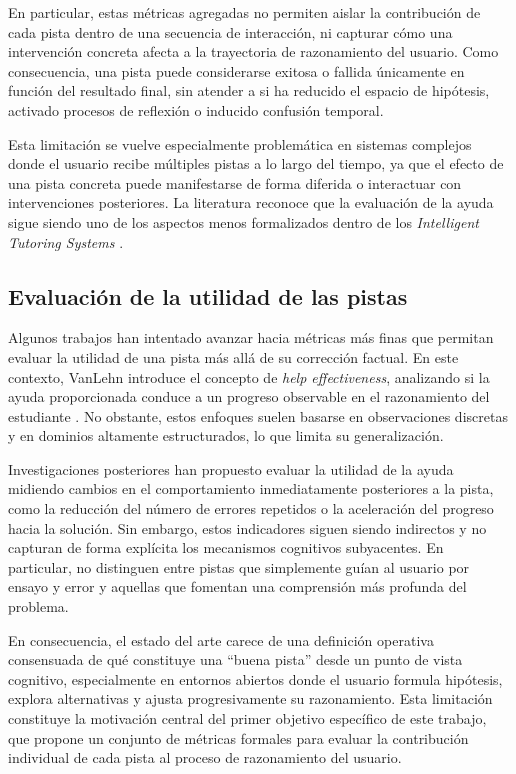 \documentclass[../main.tex]{subfiles}
\begin{document}
En particular, estas métricas agregadas no permiten aislar la contribución de cada pista dentro de una secuencia de interacción, ni capturar cómo una intervención concreta afecta a la trayectoria de razonamiento del usuario. Como consecuencia, una pista puede considerarse exitosa o fallida únicamente en función del resultado final, sin atender a si ha reducido el espacio de hipótesis, activado procesos de reflexión o inducido confusión temporal.

Esta limitación se vuelve especialmente problemática en sistemas complejos donde el usuario recibe múltiples pistas a lo largo del tiempo, ya que el efecto de una pista concreta puede manifestarse de forma diferida o interactuar con intervenciones posteriores. La literatura reconoce que la evaluación de la ayuda sigue siendo uno de los aspectos menos formalizados dentro de los \textit{Intelligent Tutoring Systems} \cite{VanLehn2006}.

\subsection{Evaluación de la utilidad de las pistas}

Algunos trabajos han intentado avanzar hacia métricas más finas que permitan evaluar la utilidad de una pista más allá de su corrección factual. En este contexto, VanLehn introduce el concepto de \textit{help effectiveness}, analizando si la ayuda proporcionada conduce a un progreso observable en el razonamiento del estudiante \cite{VanLehn2006}. No obstante, estos enfoques suelen basarse en observaciones discretas y en dominios altamente estructurados, lo que limita su generalización.

Investigaciones posteriores han propuesto evaluar la utilidad de la ayuda midiendo cambios en el comportamiento inmediatamente posteriores a la pista, como la reducción del número de errores repetidos o la aceleración del progreso hacia la solución. Sin embargo, estos indicadores siguen siendo indirectos y no capturan de forma explícita los mecanismos cognitivos subyacentes. En particular, no distinguen entre pistas que simplemente guían al usuario por ensayo y error y aquellas que fomentan una comprensión más profunda del problema.

En consecuencia, el estado del arte carece de una definición operativa consensuada de qué constituye una “buena pista” desde un punto de vista cognitivo, especialmente en entornos abiertos donde el usuario formula hipótesis, explora alternativas y ajusta progresivamente su razonamiento. Esta limitación constituye la motivación central del primer objetivo específico de este trabajo, que propone un conjunto de métricas formales para evaluar la contribución individual de cada pista al proceso de razonamiento del usuario.
\end{document}
